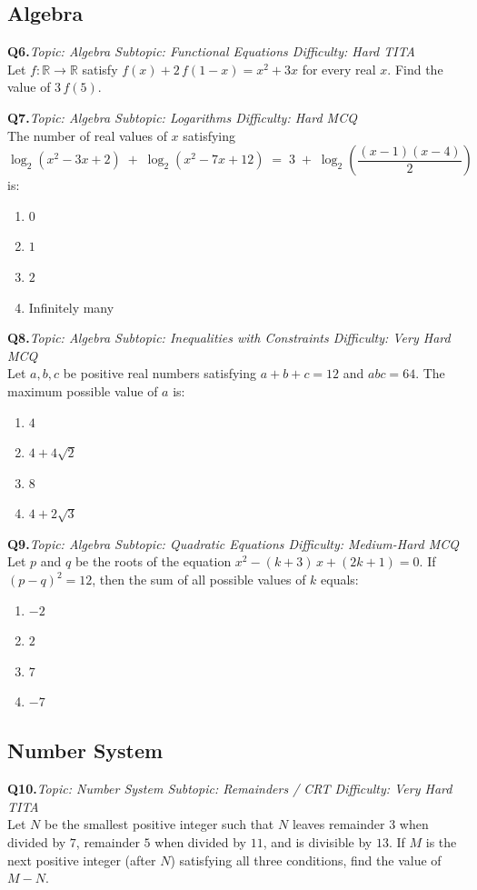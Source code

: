 \documentclass[11pt,a4paper]{article}
\newcommand{\qhead}[4]{%
  \vspace{0.7em}\noindent\textbf{Q#1.}\hfill\textit{Topic: #2 \textbar{} Subtopic: #3 \textbar{} Difficulty: #4}\\[-0.2em]
}
\begin{document}
\subsection*{Algebra}

\qhead{6}{Algebra}{Functional Equations}{Hard \textbar{} TITA}
Let $f:\mathbb{R}\to\mathbb{R}$ satisfy $f(x)+2\,f(1-x)=x^{2}+3x$ for every real $x$. Find the value of $3\,f(5)$.

\qhead{7}{Algebra}{Logarithms}{Hard \textbar{} MCQ}
The number of real values of $x$ satisfying
\[
\log_{2}(x^{2}-3x+2)\;+\;\log_{2}(x^{2}-7x+12)\;=\;3\;+\;\log_{2}\!\left(\frac{(x-1)(x-4)}{2}\right)
\]
is:
\begin{enumerate}[label=(\Alph*),leftmargin=*]
  \item $0$
  \item $1$
  \item $2$
  \item Infinitely many
\end{enumerate}

\qhead{8}{Algebra}{Inequalities with Constraints}{Very Hard \textbar{} MCQ}
Let $a, b, c$ be positive real numbers satisfying $a+b+c=12$ and $abc=64$. The maximum possible value of $a$ is:
\begin{enumerate}[label=(\Alph*),leftmargin=*]
  \item $4$
  \item $4+4\sqrt{2}$
  \item $8$
  \item $4+2\sqrt{3}$
\end{enumerate}

\qhead{9}{Algebra}{Quadratic Equations}{Medium-Hard \textbar{} MCQ}
Let $p$ and $q$ be the roots of the equation $x^{2}-(k+3)\,x+(2k+1)=0$. If $(p-q)^{2}=12$, then the sum of all possible values of $k$ equals:
\begin{enumerate}[label=(\Alph*),leftmargin=*]
  \item $-2$
  \item $2$
  \item $7$
  \item $-7$
\end{enumerate}

\subsection*{Number System}

\qhead{10}{Number System}{Remainders / CRT}{Very Hard \textbar{} TITA}
Let $N$ be the smallest positive integer such that $N$ leaves remainder $3$ when divided by $7$, remainder $5$ when divided by $11$, and is divisible by $13$. If $M$ is the next positive integer (after $N$) satisfying all three conditions, find the value of $M-N$.
\end{document}
